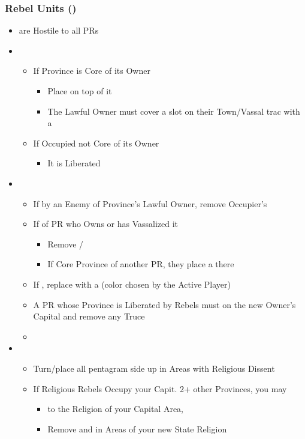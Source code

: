 \documentclass[10pt]{article}
\begin{document}
\subsubsection*{Rebel Units (\rebel)}
\begin{itemize}
	\item \rebels are Hostile to all PRs
	\item {}
	\begin{itemize}
		\item If Province is Core of its Owner
		\begin{itemize}
			\item Place \rebeltown on top of it
			\item The Lawful Owner must cover a slot on their Town/Vassal trac with a \cube
		\end{itemize}
		\item If Occupied  not Core of its Owner
		\begin{itemize}
			\item It is Liberated
		\end{itemize}
	\end{itemize}
	\item {}
	\begin{itemize}
		\item If  by an Enemy of Province's Lawful Owner, remove Occupier's \town
		\item If  of PR who Owns or has Vassalized it
		\begin{itemize}
			\item Remove \town/\vassal
			\item If Core Province of another PR, they place a \town there
		\end{itemize}
		\item If , replace \town with a \dnpr (color chosen by the Active Player)
		\item A PR whose Province is Liberated by Rebels must  on the new Owner's Capital and remove any Truce
		\item {}
	\end{itemize}
	\item {}
	\begin{itemize}
		\item Turn/place all \rebeltowns pentagram side up in Areas with Religious Dissent
		\item If Religious Rebels Occupy your Capit.  2+ other Provinces, you may
		\begin{itemize}
			\item {} to the Religion of your Capital Area, 
			\item Remove \rebels and \rebeltowns in Areas of your new State Religion
		\end{itemize}
	\end{itemize}
\end{itemize}
\end{document}
